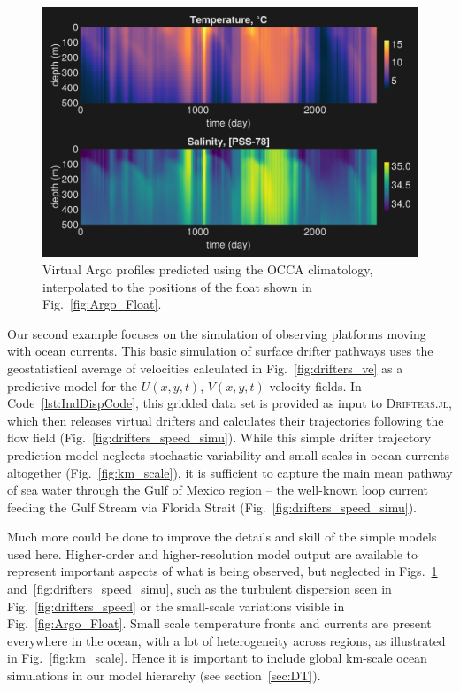 \documentclass{juliacon}[12pt]
\newcommand{\pkg}[1]{{\small \textsc{#1}}}
\begin{document}
\begin{figure}[t]
\centerline{\includegraphics[width=\columnwidth]{figs/20240529_MITprof_OCCA.png}}
\caption{Virtual Argo profiles predicted using the OCCA climatology, interpolated to the positions of the float shown in Fig.~\ref{fig:Argo_Float}.}
\label{fig:Argo_Float_simu}
\end{figure}

Our second example focuses on the simulation of observing platforms moving with ocean currents. This basic simulation of surface drifter pathways uses the geostatistical average of velocities calculated in Fig.~\ref{fig:drifters_ve} as a predictive model for the $U(x,y,t)$, $V(x,y,t)$ velocity fields. In Code~\ref{lst:IndDispCode}, this gridded data set is provided as input to \pkg{Drifters.jl}, which then releases virtual drifters and calculates their trajectories following the flow field (Fig.~\ref{fig:drifters_speed_simu}). While this simple drifter trajectory prediction model neglects stochastic variability and small scales in ocean currents altogether (Fig.~\ref{fig:km_scale}), it is sufficient to capture the main mean pathway of sea water through the Gulf of Mexico region -- the well-known loop current feeding the Gulf Stream via Florida Strait (Fig.~\ref{fig:drifters_speed_simu}).

Much more could be done to improve the details and skill of the simple models used here. Higher-order and higher-resolution model output are available to represent important aspects of what is being observed, but neglected in Figs.~\ref{fig:Argo_Float_simu} and~\ref{fig:drifters_speed_simu}, such as the turbulent dispersion seen in Fig.~\ref{fig:drifters_speed} or the small-scale variations visible in Fig.~\ref{fig:Argo_Float}. Small scale temperature fronts and currents are present everywhere in the ocean, with a lot of heterogeneity across regions, as illustrated in Fig.~\ref{fig:km_scale}. Hence it is important to include global km-scale ocean simulations in our model hierarchy (see section~\ref{sec:DT}). 
\end{document}
